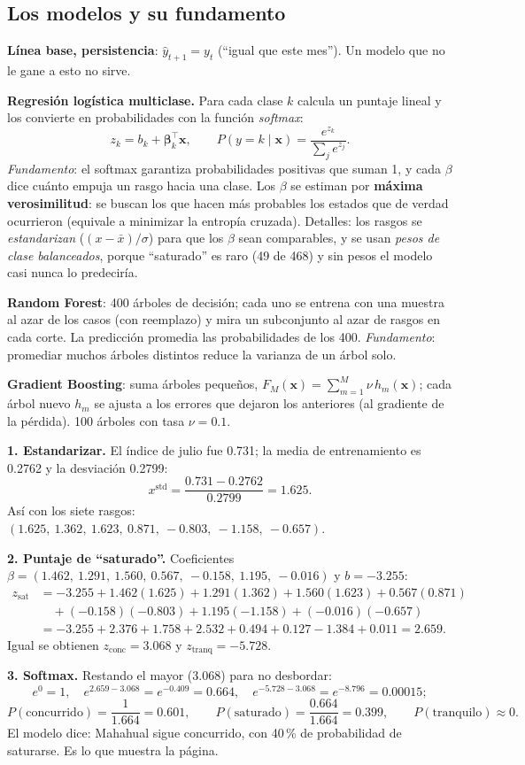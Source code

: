 \subsection{Los modelos y su fundamento}
\textbf{Línea base, persistencia}: $\hat y_{t+1}=y_t$ (``igual que este mes''). Un modelo que no le gane a esto no sirve.

\textbf{Regresión logística multiclase.} Para cada clase $k$ calcula un puntaje lineal y los convierte en
probabilidades con la función \emph{softmax}:
\[
z_k=b_k+\bm\beta_k^{\top}\bm x,\qquad P(y=k\mid \bm x)=\frac{e^{z_k}}{\sum_j e^{z_j}} .
\]
\emph{Fundamento}: el softmax garantiza probabilidades positivas que suman 1, y cada $\beta$ dice cuánto empuja un rasgo
hacia una clase. Los $\beta$ se estiman por \textbf{máxima verosimilitud}: se buscan los que hacen más probables los
estados que de verdad ocurrieron (equivale a minimizar la entropía cruzada). Detalles: los rasgos se \emph{estandarizan}
($(x-\bar x)/\sigma$) para que los $\beta$ sean comparables, y se usan \emph{pesos de clase balanceados}, porque
``saturado'' es raro (49 de 468) y sin pesos el modelo casi nunca lo predeciría.

\textbf{Random Forest}: 400 árboles de decisión; cada uno se entrena con una muestra al azar de los casos (con
reemplazo) y mira un subconjunto al azar de rasgos en cada corte. La predicción promedia las probabilidades de los 400.
\emph{Fundamento}: promediar muchos árboles distintos reduce la varianza de un árbol solo.

\textbf{Gradient Boosting}: suma árboles pequeños, $F_M(\bm x)=\sum_{m=1}^{M}\nu\,h_m(\bm x)$; cada árbol nuevo $h_m$ se
ajusta a los errores que dejaron los anteriores (al gradiente de la pérdida). 100 árboles con tasa $\nu=0.1$.

\begin{amano}
\textbf{1. Estandarizar.} El índice de julio fue 0.731; la media de entrenamiento es 0.2762 y la desviación 0.2799:
\[x^{\text{std}}=\frac{0.731-0.2762}{0.2799}=1.625 .\]
Así con los siete rasgos: $(1.625,\ 1.362,\ 1.623,\ 0.871,\ -0.803,\ -1.158,\ -0.657)$.

\textbf{2. Puntaje de ``saturado''.} Coeficientes $\beta=(1.462,\ 1.291,\ 1.560,\ 0.567,\ -0.158,\ 1.195,\ -0.016)$ y
$b=-3.255$:
\begin{align*}
z_{\text{sat}}&=-3.255+1.462(1.625)+1.291(1.362)+1.560(1.623)+0.567(0.871)\\
&\quad+(-0.158)(-0.803)+1.195(-1.158)+(-0.016)(-0.657)\\
&=-3.255+2.376+1.758+2.532+0.494+0.127-1.384+0.011=2.659 .
\end{align*}
Igual se obtienen $z_{\text{conc}}=3.068$ y $z_{\text{tranq}}=-5.728$.

\textbf{3. Softmax.} Restando el mayor (3.068) para no desbordar:
\[
e^{0}=1,\quad e^{2.659-3.068}=e^{-0.409}=0.664,\quad e^{-5.728-3.068}=e^{-8.796}=0.00015 ;
\]
\[
P(\text{concurrido})=\frac{1}{1.664}=0.601,\qquad P(\text{saturado})=\frac{0.664}{1.664}=0.399,\qquad P(\text{tranquilo})\approx0 .
\]
El modelo dice: Mahahual sigue concurrido, con 40\,\% de probabilidad de saturarse. Es lo que muestra la página.
\end{amano}

